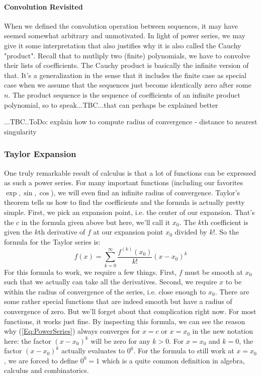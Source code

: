 
\paragraph{Convolution Revisited}
When we defined the convolution operation between sequences, it may have seemed somewhat arbitrary and unmotivated. In light of power series, we may give it some interpretation that also justifies why it is also called the Cauchy "product". Recall that to mutliply two (finite) polynomials, we have to convolve their lists of coefficients. The Cauchy product is basically the infinite version of that. It's a generalization in the sense that it includes the finite case as special case when we assume that the sequences just become identically zero after some $n$. The product sequence is the sequence of coefficients of an infinite product polynomial, so to speak...TBC...that can perhaps be explained better

\medskip
...TBC..ToDo: explain how to compute radius of convergence - distance to nearest singularity


\subsubsection{Taylor Expansion}
One truly remarkable result of calculus is that a lot of functions can be expressed as such a power series. For many important functions (including our favorites $\exp, \sin, \cos$), we will even find an infinite radius of convergence. Taylor's theorem tells us how to find the coefficients and the formula is actually pretty simple. First, we pick an expansion point, i.e. the center of our expansion. That's the $c$ in the formula given above but here, we'll call it $x_0$. The $k$th coefficient is given the $k$th derivative of $f$ at our expansion point $x_0$ divided by $k!$. So the formula for the Taylor series is:
\begin{equation}
\label{Eq:TaylorSeries}
f(x) = \sum_{k=0}^\infty \frac{f^{(k)}(x_0)}{k!} (x-x_0)^k
\end{equation}
For this formula to work, we require a few things. First, $f$ must be smooth at $x_0$ such that we actually can take all the derivatives. Second, we require $x$ to be within the radius of convergence of the series, i.e. close enough to $x_0$. There are some rather special functions that are indeed smooth but have a radius of convergence of zero. But we'll forget about that complication right now. For most functions, it works just fine. By inspecting this formula, we can see the reason why (\ref{Eq:PowerSeries}) always converges for $x=c$ or $x=x_0$ in the new notation here: the factor $(x-x_0)^k$ will be zero for any $k > 0$. For $x = x_0$ and $k = 0$, the factor $(x-x_0)^k$ actually evaluates to $0^0$. For the formula to still work at $x=x_0$, we are forced to define $0^0 = 1$ which is a quite common definition in algebra, calculus and combinatorics.

